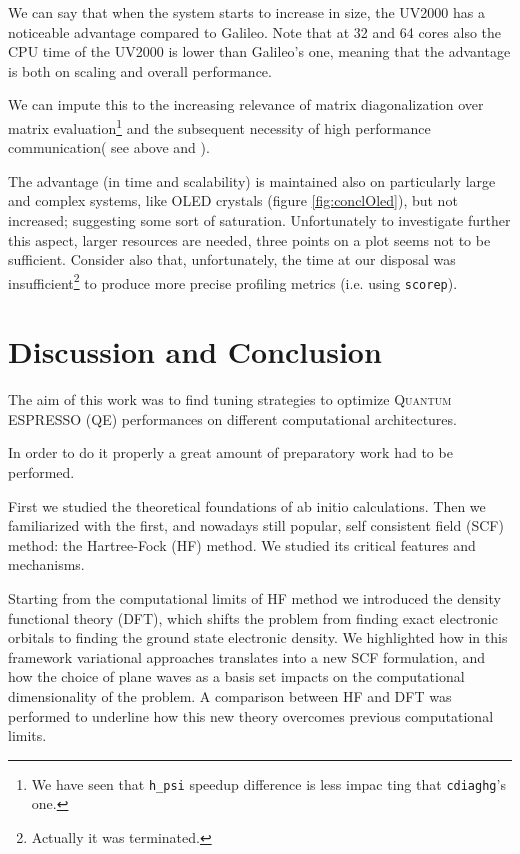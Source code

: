 \documentclass[a4paper,12pt]{article}
\newcommand\QE{\textsc{Quantum} ESPRESSO }
\begin{document}
We can say that when the system starts to increase in size, the UV2000 has a noticeable advantage compared to Galileo.
Note that at 32 and 64 cores also the CPU time of the UV2000 is lower than Galileo's one, meaning that the advantage is both on scaling and overall performance.

We can impute this to the increasing relevance of matrix diagonalization over matrix evaluation\footnote{We have seen that \texttt{h\_psi} speedup difference is less impac	ting that \texttt{cdiaghg}'s one.} and the subsequent necessity of high performance communication( see above and \cite{QE2}).


The advantage (in time and scalability) is maintained also on particularly large and complex systems, like OLED crystals (figure \ref{fig:conclOled}), but not increased; suggesting some sort of saturation.
Unfortunately to investigate further this aspect, larger resources are needed, three points on a plot seems not to be sufficient.
Consider also that, unfortunately, the time at our disposal was insufficient\footnote{Actually it was terminated.} to produce more precise profiling metrics (i.e. using \texttt{scorep}).

\newpage
\section{Discussion and Conclusion}\label{sec:conclusions}

The aim of this work was to find tuning strategies to optimize \QE (QE) performances on different computational architectures.

In order to do it properly a great amount of preparatory work had to be performed.

First we studied the theoretical foundations of ab initio calculations. 
Then we familiarized with the first, and nowadays still popular, self consistent field (SCF) method: the Hartree-Fock (HF) method.
We studied its critical features and mechanisms.

Starting from the computational limits of HF method we introduced the density functional theory (DFT), which shifts the problem from finding exact electronic orbitals to finding the ground state electronic density.
We highlighted how in this framework variational approaches translates into a new SCF formulation, and how the choice of plane waves as a basis set impacts on the computational dimensionality of the problem.
A comparison between HF and DFT was performed to underline how this new theory overcomes previous computational limits.
\end{document}
